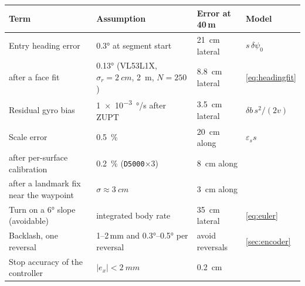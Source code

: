 \documentclass[11pt,a4paper]{article}
\newcommand{\code}[1]{\texttt{\small #1}}
\begin{document}
\begin{center}
\small
\begin{tabularx}{\textwidth}{@{}P{42mm}P{44mm}P{24mm}L@{}}
\toprule
\textbf{Term} & \textbf{Assumption} & \textbf{Error at 40\,m} & \textbf{Model}\\
\midrule
Entry heading error & \ang{0.3} at segment start & \qty{21}{cm} lateral & $s\,\delta\psi_0$\\
\quad after a face fit & \ang{0.13} (VL53L1X, $\sigma_r=\qty{2}{cm}$, \qty{2}{m}, $N=250$) & \qty{8.8}{cm} lateral & \cref{eq:headingfit}\\
Residual gyro bias & \qty{1e-3}{\degree/s} after ZUPT & \qty{3.5}{cm} lateral & $\delta b\,s^2/(2v)$\\
Scale error & \qty{0.5}{\percent} & \qty{20}{cm} along & $\varepsilon_s s$\\
\quad after per-surface calibration & \qty{0.2}{\percent} (\code{D5000}$\times3$) & \qty{8}{cm} along & \\
\quad after a landmark fix near the waypoint & $\sigma\approx\qty{3}{cm}$ & \qty{3}{cm} along & \\
Turn on a \ang{6} slope (avoidable) & integrated body rate & \qty{35}{cm} lateral & \cref{eq:euler}\\
Backlash, one reversal & 1--2\,mm and \ang{0.3}--\ang{0.5} per reversal & avoid reversals & \cref{sec:encoder}\\
Stop accuracy of the controller & $|e_x|<\qty{2}{mm}$ & \qty{0.2}{cm} & \\
\bottomrule
\end{tabularx}
\end{center}
\end{document}
